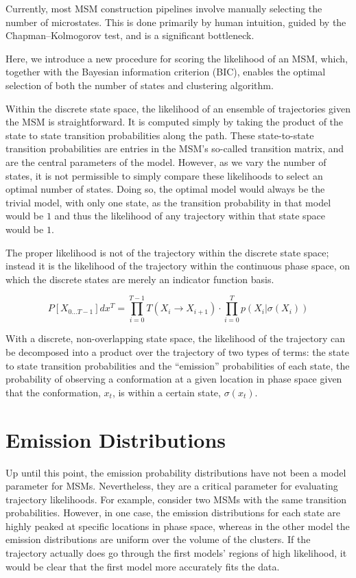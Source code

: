 \documentclass[twocolumn,floatfix,nofootinbib,aps]{revtex4-1}
\begin{document}
Currently, most MSM construction pipelines involve manually selecting the number of microstates. This is done primarily by human intuition, guided by the Chapman–Kolmogorov test, and is a significant bottleneck.

Here, we introduce a new procedure for scoring the likelihood of an MSM, which, together with the Bayesian information criterion (BIC), enables the optimal selection of both the number of states and clustering algorithm.

Within the discrete state space, the likelihood of an ensemble of
trajectories given the MSM is straightforward. It is computed simply by taking the product of the state to state transition probabilities along the path.
These state-to-state transition probabilities are entries in the MSM's so-called transition matrix, and are the central parameters of the model. However, as we vary the number of states, it is not permissible to simply compare these likelihoods to select an optimal number of states. Doing so, the optimal model would always be the trivial model, with only one state, as the transition probability in that model would be $1$ and thus the likelihood of any trajectory within that state space would be $1$.

The proper likelihood is not of the trajectory within the discrete state
space; instead it is the likelihood of the trajectory within the
continuous phase space, on which the discrete states are merely an
indicator function basis. 

\begin{equation}
P[X_{0...T-1}] dx^T = \prod_{i=0}^{T-1} T(X_i \rightarrow X_{i+1}) \cdot \prod_{i=0}^{T} p(X_{i} | \sigma(X_{i}))
\label{eq:like}
\end{equation}

With a discrete, non-overlapping state space, the likelihood of the
trajectory can be decomposed into a product over the trajectory of two
types of terms: the state to state transition probabilities and the
``emission'' probabilities of each state, the probability of observing a
conformation at a given location in phase space given that the
conformation, $x_t$, is within a certain state, $\sigma(x_t)$.

\section{Emission Distributions}

Up until this point, the emission probability distributions have not
been a model parameter for MSMs. Nevertheless, they are a critical
parameter for evaluating trajectory likelihoods. For example, consider two MSMs with the same transition probabilities. However, in one case, the emission distributions for each state are highly peaked at specific locations in phase space, whereas in the other model the emission distributions are uniform over the volume of the clusters. If the trajectory actually does go through the first models' regions of high likelihood, it would be clear that the first model more accurately fits the data.
\end{document}
